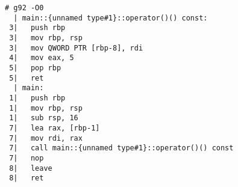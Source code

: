 \begin{lstlisting}[language={},numbers=none,title=\href{https://godbolt.org/z/foj6Kq}{\texttt{godbolt.org/z/foj6Kq}}]
# g92 -O0
  | main::{unnamed type#1}::operator()() const:
 3|   push rbp
 3|   mov rbp, rsp
 3|   mov QWORD PTR [rbp-8], rdi
 4|   mov eax, 5
 5|   pop rbp
 5|   ret
  | main:
 1|   push rbp
 1|   mov rbp, rsp
 1|   sub rsp, 16
 7|   lea rax, [rbp-1]
 7|   mov rdi, rax
 7|   call main::{unnamed type#1}::operator()() const
 7|   nop
 8|   leave
 8|   ret
\end{lstlisting}
